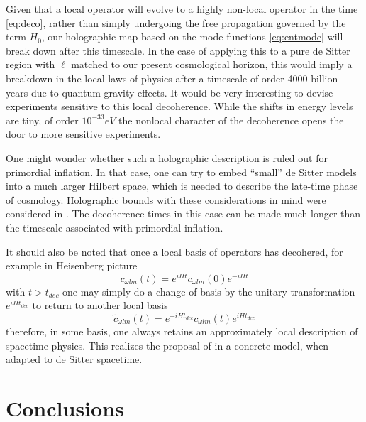 \documentclass{brownthesis}
\begin{document}
Given that a local operator will evolve to a highly non-local operator
in the time \eqref{eq:deco}, rather than simply undergoing the free
propagation governed by the term $H_{0}$, our holographic map based
on the mode functions \eqref{eq:entmode} will break down after this
timescale. In the case of applying this to a pure de Sitter region
with $\ell$ matched to our present cosmological horizon, this would
imply a breakdown in the local laws of physics after a timescale of
order 4000 billion years due to quantum gravity effects. It would
be very interesting to devise experiments sensitive to this local
decoherence. While the shifts in energy levels are tiny, of order
$10^{-33}eV$ the nonlocal character of the decoherence opens the
door to more sensitive experiments.

One might wonder whether such a holographic description is ruled out
for primordial inflation. In that case, one can try to embed ``small''
de Sitter models into a much larger Hilbert space, which is needed
to describe the late-time phase of cosmology. Holographic bounds with
these considerations in mind were considered in \cite{Banks:2003pt,Lowe:2004zs}.
The decoherence times in this case can be made much longer than the
timescale associated with primordial inflation.

It should also be noted that once a local basis of operators has decohered,
for example in Heisenberg picture
\[
c_{\omega lm}(t)=e^{iHt}c_{\omega lm}(0)e^{-iHt}
\]
with $t>t_{dec}$ one may simply do a change of basis by the unitary
transformation $e^{iHt_{dec}}$ to return to another local basis
\[
\tilde{c}_{\omega lm}(t)=e^{-iHt_{dec}}c_{\omega lm}(t)e^{iHt_{dec}}
\]
therefore, in some basis, one always retains an approximately local
description of spacetime physics. This realizes the proposal of \cite{Lowe:2015eba}
in a concrete model, when adapted to de Sitter spacetime.

\section{Conclusions}
\end{document}
